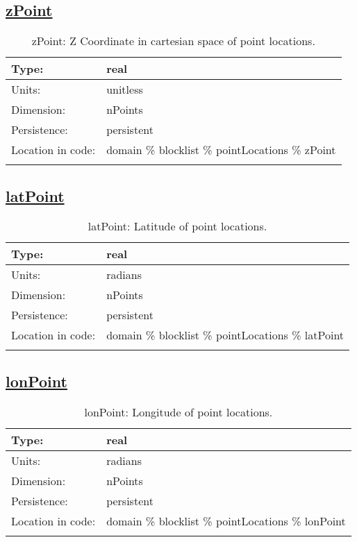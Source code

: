 \subsection[zPoint]{\hyperref[sec:var_tab_pointLocations]{zPoint}}
\label{subsec:var_sec_pointLocations_zPoint}
\begin{center}
\begin{longtable}{| p{2.0in} | p{4.0in} |}
        \hline 
        Type: & real \\
        \hline 
        Units: & \si{unitless} \\
        \hline 
        Dimension: & nPoints \\
        \hline 
        Persistence: & persistent \\
        \hline 
         Location in code: & domain \% blocklist \% pointLocations \% zPoint \\
         \hline 
    \caption{zPoint: Z Coordinate in cartesian space of point locations.}
\end{longtable}
\end{center}
\subsection[latPoint]{\hyperref[sec:var_tab_pointLocations]{latPoint}}
\label{subsec:var_sec_pointLocations_latPoint}
\begin{center}
\begin{longtable}{| p{2.0in} | p{4.0in} |}
        \hline 
        Type: & real \\
        \hline 
        Units: & \si{radians} \\
        \hline 
        Dimension: & nPoints \\
        \hline 
        Persistence: & persistent \\
        \hline 
         Location in code: & domain \% blocklist \% pointLocations \% latPoint \\
         \hline 
    \caption{latPoint: Latitude of point locations.}
\end{longtable}
\end{center}
\subsection[lonPoint]{\hyperref[sec:var_tab_pointLocations]{lonPoint}}
\label{subsec:var_sec_pointLocations_lonPoint}
\begin{center}
\begin{longtable}{| p{2.0in} | p{4.0in} |}
        \hline 
        Type: & real \\
        \hline 
        Units: & \si{radians} \\
        \hline 
        Dimension: & nPoints \\
        \hline 
        Persistence: & persistent \\
        \hline 
         Location in code: & domain \% blocklist \% pointLocations \% lonPoint \\
         \hline 
    \caption{lonPoint: Longitude of point locations.}
\end{longtable}
\end{center}
